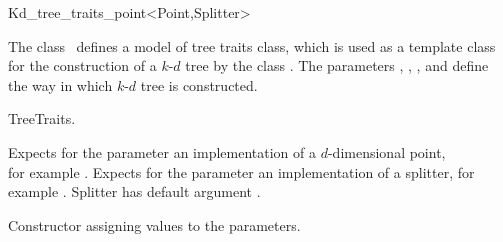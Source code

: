

\begin{ccRefClass}{Kd_tree_traits_point<Point,Splitter>}  %


\ccDefinition
  
The class \ccRefName\ defines a model of tree traits class, which is used as
a template class for the construction of a $k$-$d$ tree by the class .
The parameters , , , and   
define the way in which $k$-$d$ tree is constructed.



\ccIsModel

TreeTraits.

\ccParameters

Expects for the parameter  an implementation of a $d$-dimensional point, \\
for example .
Expects for the parameter  an implementation of a splitter, for
example .
Splitter has default argument .

\ccTypes



\ccCreation
{}  %



{Constructor assigning values to the parameters.}


\end{ccRefClass}
